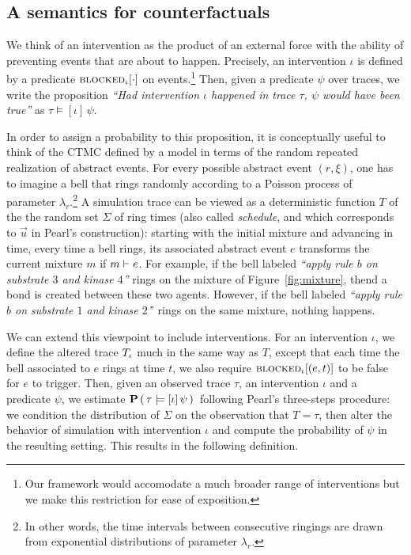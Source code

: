 \subsection{A semantics for counterfactuals}
We think of an intervention as the product of an external force with
the ability of preventing events that are about to happen. Precisely,
an intervention $\iota$ is defined by a predicate
${\textsc{blocked}}_{\iota}[\cdot]$ on events.\footnote{Our framework would
  accomodate a much broader range of interventions but we make this
  restriction for ease of exposition.}  Then, given a predicate $\psi$
over traces, we write the proposition \textit{``Had
  intervention $\iota$ happened in trace $\tau$, $\psi$ would have
  been true''} as $\tau \models [\iota] \, \psi.$


In order to assign a probability to this proposition, it is
conceptually useful to think of the CTMC defined by a model
in terms of the random repeated realization of abstract events.  For
every possible abstract event $(r, \xi)$, one has to imagine a bell
that rings randomly according to a Poisson process of parameter
$\lambda_r$.\footnote{In other words, the time intervals between
  consecutive ringings are drawn from exponential distributions of
  parameter $\lambda_r$.}  A simulation trace can be viewed as a
deterministic function $T$ of the
the random set $\Sigma$ of ring times (also called \emph{schedule},
and which corresponds to $\vec{u}$ in Pearl's construction): starting
with the initial mixture and advancing in time, every time a bell
rings, its associated abstract event $e$ transforms the current
mixture $m$ if $m \vdash e$. For example, if the bell labeled
\textit{``apply rule $b$ on substrate $3$ and kinase $4$''} rings on
the mixture of Figure~\ref{fig:mixture}, thend a bond is created
between these two agents. However, if the bell labeled \textit{``apply
  rule $b$ on substrate $1$ and kinase $2$'}' rings on the same
mixture, nothing happens.

We can extend this viewpoint to include interventions. For an
intervention $\iota$, we define the altered trace ${T_\iota}{}$ much in
the same way as $T$, except that each time the bell associated to $e$
rings at time $t$, we also require ${\textsc{blocked}}_{\iota}[(e, t)]$ to be
false for $e$ to trigger. Then, given an observed trace $\tau$, an
intervention $\iota$ and a predicate $\psi$, we estimate $\mathbf{P}\left( \,\tau \models [\iota] \, \psi \,\right){}$
following Pearl's three-steps procedure: \ItAbduction{} we condition
the distribution of $\Sigma$ on the observation that $T=\tau$, then
\ItAction{} alter the behavior of simulation with intervention $\iota$
and \ItPrediction{} compute the probability of $\psi$ in the resulting
setting. This results in the following definition.

